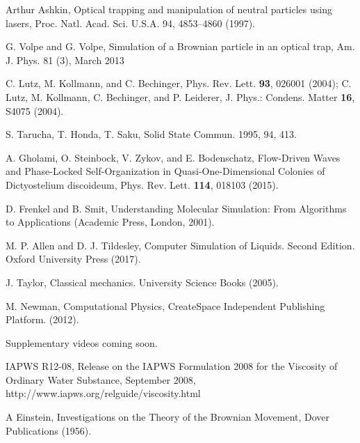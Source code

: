 \documentclass[twocolumn,preprintnumbers,amsmath,amssymb,aps,prx]{revtex4}
\begin{document}
\begin{thebibliography}{99}
      Arthur Ashkin, Optical trapping and manipulation of neutral particles using lasers, Proc. Natl. Acad. Sci. U.S.A. 94, 4853–4860 (1997).
        
       G. Volpe and G. Volpe, Simulation of a Brownian particle in an optical trap, Am. J. Phys. 81 (3), March 2013
        
     C. Lutz, M. Kollmann, and C. Bechinger, Phys. Rev. Lett. {\bf 93}, 026001 (2004); C. Lutz, M. Kollmann, C. Bechinger, and P. Leiderer, J. Phys.: Condens. Matter {\bf 16}, S4075 (2004).

      S. Tarucha, T. Honda,  T. Saku, Solid State Commun. 1995, 94, 413.

     A. Gholami, O. Steinbock, V. Zykov, and E. Bodenschatz, Flow-Driven Waves and Phase-Locked Self-Organization in Quasi-One-Dimensional Colonies of Dictyostelium discoideum, Phys. Rev. Lett. {\bf 114}, 018103 (2015).


     D. Frenkel and B. Smit, Understanding Molecular Simulation: From Algorithms to Applications (Academic Press, London, 2001).
      
     M. P. Allen and D. J. Tildesley, Computer Simulation of Liquids.  Second Edition. Oxford University Press (2017).

     J. Taylor,  Classical mechanics. University Science Books (2005).

       M. Newman, Computational Physics, CreateSpace Independent Publishing Platform. (2012).
      
       Supplementary videos coming soon.

  IAPWS R12-08, 
  Release on the IAPWS Formulation 2008 for the Viscosity of Ordinary Water Substance, 
  September 2008, 
  http://www.iapws.org/relguide/viscosity.html

   A Einstein, Investigations on the Theory of the Brownian Movement,  Dover Publications (1956).


\end{thebibliography}
\end{document}
